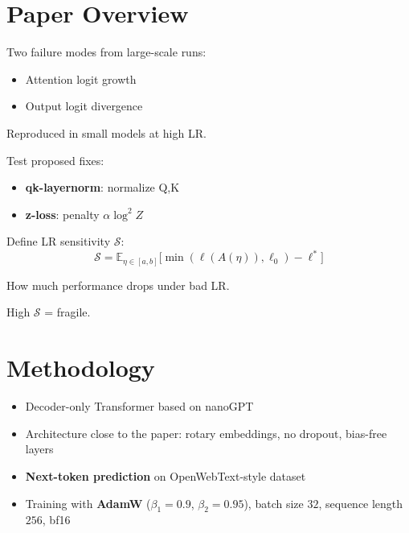 \documentclass[12pt,a4paper]{article}
\begin{document}
\section{Paper Overview}
\noindent
\begin{minipage}[t]{0.32\linewidth}
\begin{graybox}[Step 1: Identify, equal height group=A]
\small
Two failure modes from large-scale runs:
\begin{itemize}[leftmargin=12pt, itemsep=1pt]
  \item Attention logit growth
  \item Output logit divergence
\end{itemize}
Reproduced in small models at high LR.
\end{graybox}
\end{minipage}
\hfill
\begin{minipage}[t]{0.32\linewidth}
\begin{graybox}[Step 2: Mitigate, equal height group=A]
\small
Test proposed fixes:
\begin{itemize}[leftmargin=12pt, itemsep=1pt]
  \item \textbf{qk-layernorm}: normalize Q,K
  \item \textbf{z-loss}: penalty $\alpha \log^2 Z$
\end{itemize}
\end{graybox}
\end{minipage}
\hfill
\begin{minipage}[t]{0.32\linewidth}
\begin{graybox}[Step 3: Quantify, equal height group=A]
\small
Define LR sensitivity $\mathcal{S}$:
\[
\mathcal{S} = \mathbb{E}_{\eta\in[a,b]}\!\bigl[\min(\ell(A(\eta)),\ell_0) - \ell^*\bigr]
\]

How much performance drops under bad LR.

High $\mathcal{S}$ = fragile.
\end{graybox}
\end{minipage}

\section{Methodology}

\begin{graybox}
\small
\begin{itemize}[leftmargin=12pt, itemsep=2pt]
  \item Decoder-only Transformer based on nanoGPT
  \item Architecture close to the paper: rotary embeddings, no dropout, bias-free layers
  \item \textbf{Next-token prediction} on OpenWebText-style dataset
  \item Training with \textbf{AdamW} (\(\beta_1=0.9\), \(\beta_2=0.95\)), batch size \(32\), sequence length \(256\), bf16
\end{itemize}
\end{graybox}
\end{document}
